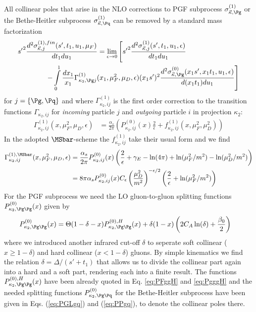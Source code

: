 All collinear poles that arise in the NLO corrections to PGF subprocess $\sigma_{\vec\kappa,\Pg}^{(1)}$ or the Bethe-Heitler subprocess $\sigma_{\vec\kappa,\Pq}^{(1)}$ can be removed by a standard mass factorization 
\begin{align}
&{s'}^2\frac{d^2\sigma_{\vec \kappa,j}^{(1),fin}(s',t_1,u_1,\mu_F)}{dt_1du_1} = \lim_{\epsilon\rightarrow 0}\left[{s'}^2\frac{d^2\sigma_{\vec \kappa,j}^{(1)}(s',t_1,u_1,\epsilon)}{dt_1du_1} \right.\nonumber\\
 &\hspace{40pt}\left. -\int\limits_0^1\frac{dx_1}{x_1}\Gamma_{\kappa_2,\Pg j}^{(1)}(x_1,\mu_F^2,\mu_D,\epsilon)(x_1s')^2\frac{d^2\sigma_{\vec \kappa,\Pg}^{(0)}(x_1s',x_1t_1,u_1,\epsilon)}{d(x_1t_1)du_1} \right]
\end{align}
for $j=\{\Pg,\Pq\}$ and where $\Gamma_{\kappa_2,ij}^{(1)}$ is the first order correction to the transition functions $\Gamma_{\kappa_2,ij}$ for \textit{incoming} particle $j$ and \textit{outgoing} particle $i$ in projection $\kappa_2$:
\begin{align}
\Gamma_{\kappa_2,ij}^{(1)}(x,\mu_F^2,\mu_D,\epsilon) &= \frac{\alpha_s}{2\pi}\left(P_{\kappa_2,ij}^{(0)}(x)\frac{2}{\epsilon} + f_{\kappa_2,ij}^{(1)}(x,\mu_F^2,\mu_D^2)\right)
\end{align}
In the adopted $\MSbar$-scheme the $f_{\kappa_2,ij}^{(1)}$ take their usual form and we find
\begin{align}
\Gamma_{\kappa_2,ij}^{(1),\MSbar}(x,\mu_F^2,\mu_D,\epsilon) &= \frac{\alpha_s}{2\pi}P_{\kappa_2,ij}^{(0)}(x)\left(\frac{2}{\epsilon} +\gamma_E - \ln(4\pi) + \ln(\mu_F^2/m^2) - \ln(\mu_D^2/m^2)\right)\\
 &= 8\pi\alpha_s P_{\kappa_2,ij}^{(0)}(x) C_\epsilon \left(\frac{\mu_D^2}{m^2}\right)^{-\epsilon/2} \left(\frac{2}{\epsilon} + \ln(\mu_F^2/m^2)\right)
\end{align}
For the PGF subprocess we need the LO gluon-to-gluon splitting functions $P_{\kappa_2,\Pg\Pg}^{(0)}(x)$ given by\cite{Altarelli:1977zs}
\begin{align}
P_{\kappa_2,\Pg\Pg}^{(0)}(x) &= \Theta(1-\delta-x)P_{\kappa_2,\Pg\Pg}^{(0),H}(x)+\delta(1-x)\left(2C_A\ln(\delta)+\frac{\beta_0}{2}\right)
\end{align}
where we introduced another infrared cut-off $\delta$ to seperate soft collinear ($x\geq 1-\delta$) and hard collinear ($x<1-\delta$) gluons. By simple kinematics we find the relation $\delta=\Delta/(s'+t_1)$ that allows us to divide the collinear part again into a hard and a soft part, rendering each into a finite result. The functions $P_{\kappa_2,\Pg\Pg}^{(0),H}(x)$ have been already quoted in Eq. \ref{eq:PFggH} and \ref{eq:PgggH} and the needed splitting functions $P_{\kappa_2,\Pg\Pq}^{(0)}$ for the Bethe-Heitler subprocess have been given in Eqs. (\ref{eq:PGLgq}) and (\ref{eq:PPgq}), to denote the collinear poles there.

